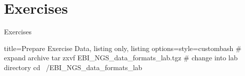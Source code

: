 \documentclass{beamer}
\begin{document}


\section{Exercises}

\begin{frame}[fragile]{Exercises}
\begin{tcblisting}{title={Prepare Exercise Data}, listing only, listing options={style=custombash}}
# expand archive
tar zxvf EBI_NGS_data_formats_lab.tgz
# change into lab directory
cd ~/EBI_NGS_data_formats_lab
\end{tcblisting}
\end{frame}


\end{document}
